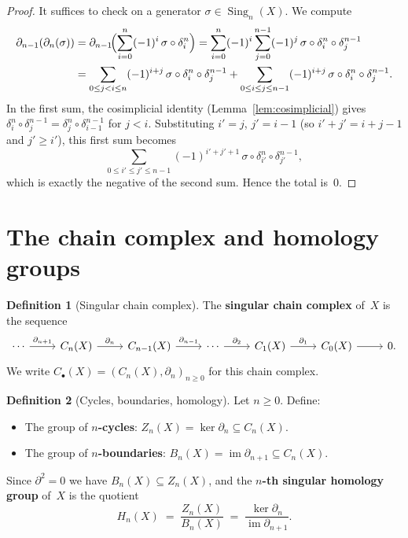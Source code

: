 \documentclass[12pt,a4paper,openany]{book}
\theoremstyle{definition}
\newtheorem{definition}{Definition}[chapter]
\theoremstyle{plain}
\theoremstyle{remark}
\DeclareMathOperator{\im}{im}
\begin{document}
\begin{proof}
It suffices to check on a generator $\sigma\in\operatorname{Sing}_n(X)$.  We compute
\begin{align*}
  \partial_{n-1}(\partial_n(\sigma))
  &= \partial_{n-1}\!\Bigl(\sum_{i=0}^{n}(-1)^i\,\sigma\circ\delta_i^n\Bigr)
   = \sum_{i=0}^{n}(-1)^i\sum_{j=0}^{n-1}(-1)^j\,
     \sigma\circ\delta_i^n\circ\delta_j^{n-1} \\
  &= \sum_{0\le j < i\le n}(-1)^{i+j}\,
     \sigma\circ\delta_i^n\circ\delta_j^{n-1}
   + \sum_{0\le i\le j\le n-1}(-1)^{i+j}\,
     \sigma\circ\delta_i^n\circ\delta_j^{n-1}.
\end{align*}
In the first sum, the cosimplicial identity
(Lemma~\ref{lem:cosimplicial}) gives
$\delta_i^n\circ\delta_j^{n-1}=\delta_j^n\circ\delta_{i-1}^{n-1}$
for $j<i$.  Substituting $i'=j$, $j'=i-1$ (so $i'+j'=i+j-1$ and
$j'\ge i'$), this first sum becomes
\[
  \sum_{0\le i'\le j'\le n-1}(-1)^{i'+j'+1}\,
  \sigma\circ\delta_{i'}^n\circ\delta_{j'}^{n-1},
\]
which is exactly the negative of the second sum.  Hence the total is~$0$.
\end{proof}

\section{The chain complex and homology groups}\label{sec:chain-complex}

\begin{definition}[Singular chain complex]\label{def:chain-complex}
The \textbf{singular chain complex} of~$X$ is the sequence
\[
\begin{tikzcd}
  \cdots \ar[r,"\partial_{n+1}"]
  & C_n(X) \ar[r,"\partial_n"]
  & C_{n-1}(X) \ar[r,"\partial_{n-1}"]
  & \cdots \ar[r,"\partial_2"]
  & C_1(X) \ar[r,"\partial_1"]
  & C_0(X) \ar[r]
  & 0.
\end{tikzcd}
\]
We write $C_\bullet(X)=(C_n(X),\partial_n)_{n\ge 0}$ for this chain complex.
\end{definition}

\begin{definition}[Cycles, boundaries, homology]\label{def:homology-groups}
Let $n\ge 0$.  Define:
\begin{itemize}[leftmargin=2em]
  \item The group of \textbf{$n$-cycles}: $Z_n(X)=\ker\partial_n\subseteq C_n(X)$.
  \item The group of \textbf{$n$-boundaries}: $B_n(X)=\im\partial_{n+1}\subseteq C_n(X)$.
\end{itemize}
Since $\partial^2=0$ we have $B_n(X)\subseteq Z_n(X)$, and the
\textbf{$n$-th singular homology group} of~$X$ is the quotient
\[
  H_n(X) \;=\; \frac{Z_n(X)}{B_n(X)}
  \;=\; \frac{\ker\partial_n}{\im\partial_{n+1}}.
\]
\end{definition}
\end{document}

